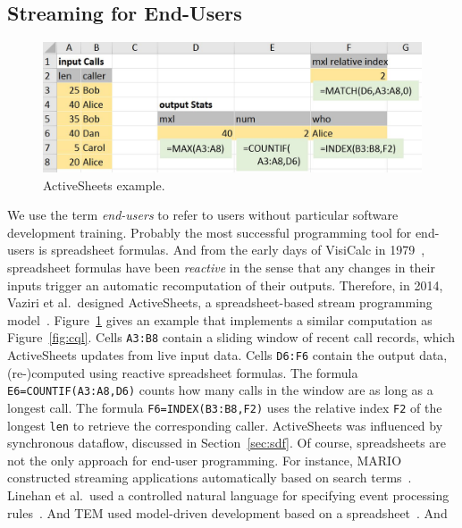 \subsection{Streaming for End-Users}\label{sec:eup} %

\begin{figure}[!h]
\centerline{\includegraphics[width=\columnwidth]{CallStats.jpg}}
\vspace*{-4mm}
\caption{\label{fig:activesheets}ActiveSheets example.}
\end{figure}

We use the term \emph{end-users} to refer to users without particular
software development training. Probably the most successful
programming tool for end-users is spreadsheet formulas. And from the
early days of VisiCalc in 1979~\cite{bricklin_frankston_1979},
spreadsheet formulas have been \emph{reactive} in the sense that any
changes in their inputs trigger an automatic recomputation of their
outputs. Therefore, in 2014, Vaziri et al.\ designed \textsf{ActiveSheets}, a
spreadsheet-based stream programming model~\cite{vaziri_et_al_2014}.
Figure~\ref{fig:activesheets} gives an example that implements a
similar computation as Figure~\ref{fig:cql}.
Cells \lstinline{A3:B8} contain a sliding window of recent call
records, which ActiveSheets updates from live input data. Cells
\lstinline{D6:F6} contain the output data, \mbox{(re-)}com\-pu\-ted
using reactive spreadsheet formulas. The formula
\mbox{\lstinline{E6=COUNTIF(A3:A8,D6)}} counts how many calls in the
window are as long as a longest call. The formula
\mbox{\lstinline{F6=INDEX(B3:B8,F2)}} uses the relative index \lstinline{F2}
of the longest \lstinline{len} to retrieve the corresponding
caller.  ActiveSheets was influenced by
synchronous dataflow, discussed in Section~\ref{sec:sdf}.
%
Of course, spreadsheets are not the
only approach for end-user programming. For instance,
\textsf{MARIO} constructed streaming applications automatically based
on search terms~\cite{riabov_et_al_2008}.  Linehan et al.\ used a
controlled natural language for specifying event processing
rules~\cite{linehan_et_al_2011}. And \textsf{TEM} used model-driven
development based on a spreadsheet~\cite{etzion_et_al_2016}. And
